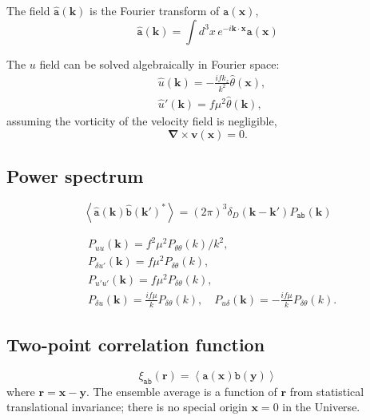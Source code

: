 \documentclass[a4paper,11pt, fleqn]{article}
\begin{document}
\vspace{5mm}
The field $\hat{\texttt{a}}(\bm{k})$ is
the Fourier transform of $\texttt{a}(\bm{x})$, 
\begin{equation}
  \hat{\texttt{a}}(\bm{k}) =
  \int\! d^3 x \, e^{-i\bm{k}\cdot\bm{x}} \texttt{a}(\bm{x})
\end{equation}

The $u$ field can be solved algebraically in Fourier space:
%
\begin{align}
  &\hat{u}(\bm{k}) = -\frac{ifk_z}{k^2} \hat{\theta}(\bm{x}),\\
  &\hat{u}'(\bm{k}) = f\mu^2 \hat{\theta}(\bm{k}),
\end{align}
%
assuming the vorticity of the velocity field is negligible,
%
\begin{equation}
  \bm{\nabla} \times \bm{v}(\bm{x}) = 0.
\end{equation}

\clearpage
\subsection{Power spectrum}
\begin{equation}
  \left\langle \hat{\mathtt{a}}(\bm{k}) \hat{\mathtt{b}}(\bm{k}')^* \right\rangle
  = (2\pi)^3 \delta_D(\bm{k}-\bm{k}') P_{\mathtt{ab}}(\bm{k})
\end{equation}

\begin{align}
  &P_{uu}(\bm{k}) = f^2\mu^2 P_{\theta\theta}(k)/k^2,\\
  &P_{\delta u'}(\bm{k}) = f \mu^2 P_{\delta \theta}(k),\\
  &P_{u' u'}(\bm{k}) = f \mu^2 P_{\delta \theta}(k),\\
  &P_{\delta u}(\bm{k}) = \frac{if\mu}{k} P_{\delta \theta}(k), \quad
  P_{u \delta}(\bm{k}) = -\frac{if\mu}{k} P_{\delta \theta}(k).
\end{align}


\clearpage
\subsection{Two-point correlation function}

\begin{equation}
  \xi_{\mathtt{ab}}(\bm{r}) = \left\langle \mathtt{a}(\bm{x}) \mathtt{b}(\bm{y})
                             \right\rangle
\end{equation}
%
where $\bm{r} = \bm{x} - \bm{y}$. The ensemble average is a function
of $\bm{r}$ from statistical translational invariance; there is no
special origin $\bm{x} = 0$ in the Universe.\\
\end{document}
